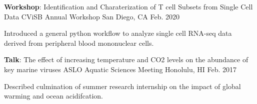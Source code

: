 \begin{cventries}
  \cventry
    {\textbf{Workshop}: Identification and Charaterization of T cell Subsets from Single Cell Data} %
    {CViSB Annual Workshop} %
    {San Diego, CA} %
    {Feb. 2020} %
    {
      \begin{cvitems} %
        \item {Introduced a general python workflow to analyze single cell RNA-seq data derived from peripheral blood mononuclear cells.}
      \end{cvitems}
    }

  \cventry
    {\textbf{Talk}: The effect of increasing temperature and CO2 levels on the abundance of key marine viruses} %
    {ASLO Aquatic Sciences Meeting} %
    {Honolulu, HI} %
    {Feb. 2017} %
    {
      \begin{cvitems} %
        \item {Described culmination of summer research internship on the impact of global warming and ocean acidifcation.}
      \end{cvitems}
    }

\end{cventries}
